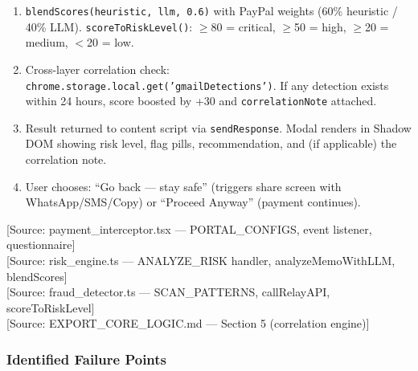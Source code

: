 \documentclass[11pt, letterpaper]{article}
\newcommand{\source}[1]{\textcolor{citation}{[Source: #1]}}
\begin{document}
\begin{enumerate}
\begin{itemize}[nosep]
        \item \texttt{callRelayAPI(memo, token, url, 5000, amount, platform)} --- LLM analysis via Cloudflare relay to Claude Haiku. Median latency: $\sim$500ms. Timeout: 5 seconds.
      \end{itemize}
    \item \texttt{blendScores(heuristic, llm, 0.6)} with PayPal weights (60\% heuristic / 40\% LLM). \texttt{scoreToRiskLevel()}: $\geq$80 = critical, $\geq$50 = high, $\geq$20 = medium, $<$20 = low.
    \item Cross-layer correlation check: \texttt{chrome.storage.local.get('gmailDetections')}. If any detection exists within 24 hours, score boosted by +30 and \texttt{correlationNote} attached.
    \item Result returned to content script via \texttt{sendResponse}. Modal renders in Shadow DOM showing risk level, flag pills, recommendation, and (if applicable) the correlation note.
    \item User chooses: ``Go back --- stay safe'' (triggers share screen with WhatsApp/SMS/Copy) or ``Proceed Anyway'' (payment continues).
  \end{enumerate}

  \source{payment\_interceptor.tsx --- PORTAL\_CONFIGS, event listener, questionnaire}\\
  \source{risk\_engine.ts --- ANALYZE\_RISK handler, analyzeMemoWithLLM, blendScores}\\
  \source{fraud\_detector.ts --- SCAN\_PATTERNS, callRelayAPI, scoreToRiskLevel}\\
  \source{EXPORT\_CORE\_LOGIC.md --- Section 5 (correlation engine)}

  \subsubsection{Identified Failure Points}
\end{document}
